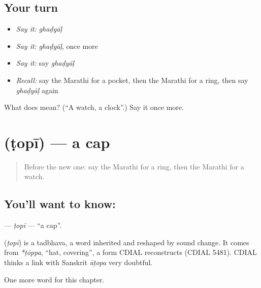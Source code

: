 \subsection*{Your turn}
\begin{itemize}
\raggedright
  \item \emph{Say it:} \emph{ghaḍyāḷ}
  \item \emph{Say it:} \emph{ghaḍyāḷ}, once more
  \item \emph{Say it:} say \emph{ghaḍyāḷ}
  \item \emph{Recall:} say the Marathi for a pocket, then the Marathi for a ring, then say \emph{ghaḍyāḷ} again
\end{itemize}

\begin{tcolorbox}[breakable,colback=teal!4,colframe=teal!35!black,title={Before you move on}]
What does  mean? (\textquotedblleft{}A watch, a clock\textquotedblright{}.) Say it once more.
\end{tcolorbox}
\section[\texorpdfstring{\mr{टोपी} (ṭopī)}{टोपी (ṭopī)}]{ (ṭopī) — a cap}

\label{lesson:MR-C117-topi}



\begin{quote}
Before the new one: say the Marathi for a ring, then the Marathi for a watch.
\end{quote}

\subsection*{You'll want to know: }
\textbf{} — \emph{ṭopī} — \textquotedblleft{}a cap\textquotedblright{}.

\begin{cousinweb}
\textbf{} (\emph{ṭopī}) is a tadbhava, a word inherited and reshaped by sound change. It comes from \emph{*ṭōppa}, \textquotedblleft{}hat, covering\textquotedblright{}, a form CDIAL reconstructs (CDIAL 5481). CDIAL thinks a link with Sanskrit \emph{āṭopa} very doubtful.
\end{cousinweb}

\begin{grammarlens}[title={What you've built}]
One more word for this chapter.
\end{grammarlens}

